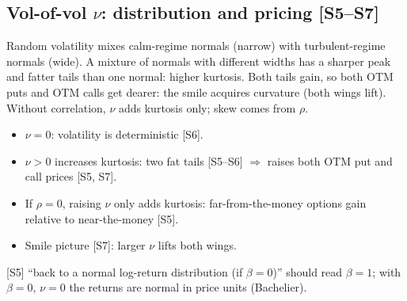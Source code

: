 \documentclass[10pt]{article}
\begin{document}
\subsection{Vol-of-vol $\nu$: distribution and pricing [S5--S7]}
\begin{idea}
Random volatility mixes calm-regime normals (narrow) with turbulent-regime normals (wide). A mixture of normals with different widths has a sharper peak and fatter tails than one normal: higher kurtosis. Both tails gain, so both OTM puts and OTM calls get dearer: the smile acquires curvature (both wings lift). Without correlation, $\nu$ adds kurtosis only; skew comes from $\rho$.
\end{idea}
\begin{itemize}
\item $\nu=0$: volatility is deterministic [S6].
\item $\nu>0$ increases kurtosis: two fat tails [S5--S6] $\Rightarrow$ raises both OTM put and call prices [S5, S7].
\item If $\rho=0$, raising $\nu$ only adds kurtosis: far-from-the-money options gain relative to near-the-money [S5].
\item Smile picture [S7]: larger $\nu$ lifts both wings.
\end{itemize}
\begin{exam}
\flag{} [S5] ``back to a normal log-return distribution (if $\beta=0$)'' should read $\beta=1$; with $\beta=0$, $\nu=0$ the returns are normal in price units (Bachelier).
\end{exam}
\end{document}
